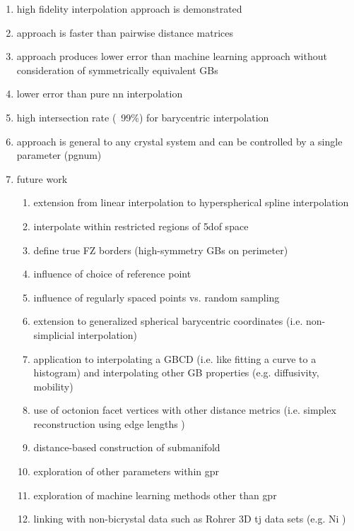 \documentclass[preprint,12pt]{elsarticle}
\begin{document}
\begin{enumerate}
    \item high fidelity interpolation approach is demonstrated
    \item approach is faster than pairwise distance matrices
    \item approach produces lower error than machine learning approach without consideration of symmetrically equivalent GBs
    \item lower error than pure \gls{nn} interpolation
    \item high intersection rate (~99\%) for barycentric interpolation
    \item approach is general to any crystal system and can be controlled by a single parameter (pgnum)
    \item future work
    \begin{enumerate}
        \item extension from linear interpolation to hyperspherical spline interpolation \cite{Taijeron1994SplineHyperspheres}
        \item interpolate within restricted regions of \gls{5dof} space
        \item define true FZ borders (high-symmetry GBs on perimeter)
        \item influence of choice of reference point
        \item influence of regularly spaced points vs. random sampling
        \item extension to generalized spherical barycentric coordinates (i.e. non-simplicial interpolation) \cite{Langer2006SphericalCoordinates}
        \item application to interpolating a GBCD (i.e. like fitting a curve to a histogram) and interpolating other GB properties (e.g. diffusivity, mobility)
        \item use of octonion facet vertices with other distance metrics (i.e. simplex reconstruction using edge lengths \cite{Connor2017High-dimensionalSearch})
        \item distance-based construction of submanifold \cite{Boissonnat2017OnlySubmanifolds}
        \item exploration of other parameters within \gls{gpr}
        \item exploration of machine learning methods other than \gls{gpr}
        \item linking with non-bicrystal data such as Rohrer 3D \gls{tj} data sets (e.g. Ni \cite{Li2009RelativeNickel})
    \end{enumerate}
\end{enumerate}
\end{document}
